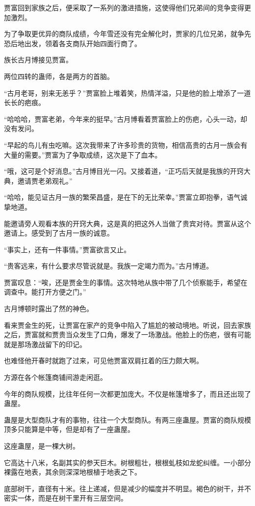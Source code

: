 \begin{this_body}
贾富回到家族之后，便采取了一系列的激进措施，这使得他们兄弟间的竞争变得更加激烈。

为了争取更优异的商队成绩，今年雪还没有完全解化时，贾家的几位兄弟，就争先恐后地出发，领着各支商队开始四面行商了。

族长古月博接见贾富。

两位四转的蛊师，各是两方的首脑。

“古月老哥，别来无恙乎？”贾富脸上堆着笑，热情洋溢，只是他的脸上增添了一道长长的疤痕。

“哈哈哈，贾富老弟，今年来的挺早。”古月博看着贾富脸上的伤疤，心头一动，却没有发问。

“早起的鸟儿有虫吃嘛。这次我带来了许多珍贵的货物，相信高贵的古月一族会有大量的需要。”贾富为了争取成绩，这次是下了血本。

“哦，这可是个好消息。”古月博目光一闪。又接着道，“正巧后天就是我族的开窍大典，邀请贾老弟观礼。”

“哈哈，能见证古月一族的繁荣昌盛，是在下的无比荣幸。”贾富立即抱拳，语气诚挚地道。

能邀请旁人观看本族的开窍大典，这是真的把这外人当做了贵宾对待。贾富从这个邀请上。感受到了古月一族的诚意。

“事实上，还有一件事情。”贾富欲言又止。

“贵客远来，有什么要求尽管说就是。我族一定竭力而为。”古月博道。

贾富叹息：“唉，还是贾金生的事情。这次特地从族中带了几个侦察能手，希望在调查中。能打开方便之门。”

古月博顿时露出了然的神色。

看来贾金生的死，让贾富在家产的竞争中陷入了尴尬的被动境地。听说，回去家族之后，贾富就和贾贵当众发生了口角，爆发了一场激战。他脸上的伤疤，很有可能就是那场激战留下的印记。

也难怪他开春时就跑了过来，可见他贾富双肩扛着的压力颇大啊。

方源在各个帐篷商铺间游走闲逛。

今年的商队规模，比往年任何一次都更加庞大。不仅是帐篷增多了，而且还出现了蛊屋。

蛊屋是大型商队才有的事物，往往一个大型商队。有两三座蛊屋。贾富的商队规模顶多只能算是中等，但是却有了一座蛊屋。

这座蛊屋，是一棵大树。

它高达十八米，名副其实的参天巨木。树根粗壮，根根虬枝如龙蛇纠缠。一小部分裸露在地表，其余则深深地根植于地表之下。

底部树干，直径有十米。往上递减，但是减少的幅度并不明显。褐色的树干，并不密实一体，而是在树干里开有三层空间。


\end{this_body}
